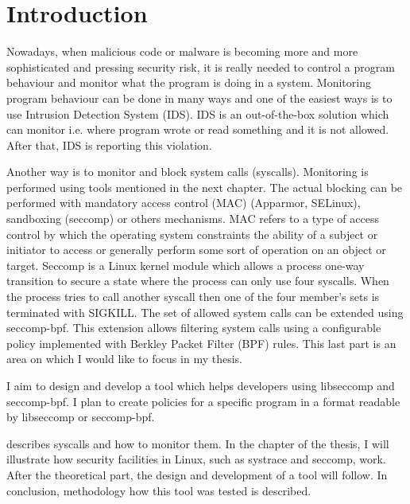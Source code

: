 


\chapter{Introduction}
Nowadays, when malicious code or malware is becoming more and more sophisticated and pressing security risk, it is really needed to control a program behaviour and monitor what the program is doing in a system.
Monitoring program behaviour can be done in many ways and one of the easiest ways is to use Intrusion Detection System (IDS).
IDS is an out-of-the-box solution which can monitor i.e. where program wrote or read something and it is not allowed.
After that, IDS is reporting this violation.

Another way is to monitor and block system calls (syscalls).
Monitoring is performed using tools mentioned in the next chapter.
The actual blocking can be performed with mandatory access control (MAC) (Apparmor, SELinux), sandboxing (seccomp) or others mechanisms.
MAC refers to a type of access control by which the operating system constraints the ability of a subject or initiator to access or generally perform some sort of operation on an object or target.
Seccomp is a Linux kernel module which allows a process one-way transition to secure a state where the process can only use four syscalls.
When the process tries to call another syscall then one of the four member's sets is terminated with SIGKILL.
The set of allowed system calls can be extended using seccomp-bpf.
This extension allows filtering system calls using a configurable policy implemented with Berkley Packet Filter (BPF) rules.
This last part is an area on which I would like to focus in my thesis.

I aim to design and develop a tool which helps developers using libseccomp and seccomp-bpf.
I plan to create policies for a specific program in a format readable by libseccomp or seccomp-bpf.

 describes syscalls and how to monitor them.
In the chapter  of the thesis, I will illustrate how security facilities in Linux, such as systrace and seccomp, work.
After the theoretical part, the design and development of a tool will follow.
In conclusion, methodology how this tool was tested is described.

